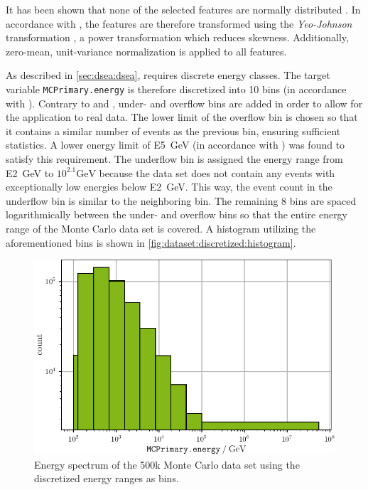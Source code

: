 It has been shown that none of the selected features are normally distributed \cite{dsea_jan}.
In accordance with \cite{dsea_jan},
the features are therefore transformed using the \emph{Yeo-Johnson} transformation \cite{yeo_johnson},
a power transformation which reduces skewness.
%
Additionally, zero-mean, unit-variance normalization is applied to all features.


As described in \autoref{sec:dsea:dsea}, \dsea{} requires discrete energy classes.
The target variable \texttt{MCPrimary.energy} is therefore discretized into \num{10} bins
(in accordance with \cite{dsea_samuel}).
%
Contrary to \cite{dsea_jan} and \cite{dsea_samuel},
under- and overflow bins are added
  in order to allow for the application to real data.
%
The lower limit of the overflow bin is chosen so that it contains a similar number of events as the previous bin,
ensuring sufficient statistics.
A lower energy limit of \SI{E5}{\giga\electronvolt} (in accordance with \cite{dsea_samuel}) was found to satisfy this requirement.
%
The underflow bin is assigned the energy range from \SI{E2}{\giga\electronvolt} to $10^{2.1} \si{\giga\electronvolt}$
  because the data set does not contain any events with exceptionally low energies below \SI{E2}{\giga\electronvolt}.
This way, the event count in the underflow bin is similar to the neighboring bin.
%
The remaining \num{8} bins are spaced logarithmically between the under- and overflow bins
  so that the entire energy range of the Monte Carlo data set is covered.
%
A histogram utilizing the aforementioned bins is shown in \autoref{fig:dataset:discretized:histogram}.

\begin{figure}
  \centering
  \includegraphics[scale=0.9]{content/plots/dataset_500k:discretized:histogram_full.pdf}
  \caption{Energy spectrum of the 500k Monte Carlo data set using the discretized energy ranges as bins.}
  \label{fig:dataset:discretized:histogram}
\end{figure}


